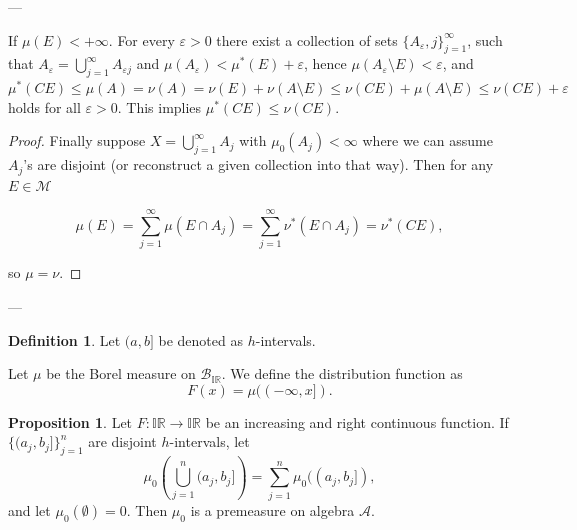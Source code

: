 \documentclass[11pt]{article}
\theoremstyle{definition}
\newtheorem{definition}{Definition}[section]
\newtheorem{proposition}{Proposition}[section]
\theoremstyle{remark}
\begin{document}
---

If $\mu(E) < +\infty$. For every $\varepsilon > 0$ there exist a collection of sets $\{A_\varepsilon, j\}_{j=1}^\infty$, such that $A_\varepsilon = \bigcup_{j=1}^\infty A_{\varepsilon j}$ and $\mu(A_\varepsilon) < \mu^*(E) + \varepsilon$, hence $\mu(A_\varepsilon \setminus E) < \varepsilon$, and $\mu^*(CE) \leq \mu(A) = \nu(A) = \nu(E) + \nu(A \setminus E) \leq \nu(CE) + \mu(A \setminus E) \leq \nu(CE) + \varepsilon$ holds for all $\varepsilon > 0$. This implies $\mu^*(CE) \leq \nu(CE)$.

\begin{proof}
Finally suppose $X = \bigcup_{j=1}^\infty A_j$ with $\mu_0(A_j) < \infty$ where we can assume $A_j$'s are disjoint (or reconstruct a given collection into that way). Then for any $E \in \mathcal{M}$

\[
\mu(E) = \sum_{j=1}^\infty \mu(E \cap A_j) = \sum_{j=1}^\infty \nu^*(E \cap A_j) = \nu^*(CE),
\]

so $\mu = \nu$.
\end{proof}

---



\begin{definition}\label{def:h-intervals}
Let $(a,b]$ be denoted as $h$-intervals.
\end{definition}

Let $\mu$ be the Borel measure on $\mathcal{B}_{\mathbb{IR}}$. We define the distribution function as
\[ F(x) = \mu((-\infty, x]). \]

\begin{proposition}\label{prop:premeasure}
Let $F: \mathbb{IR} \to \mathbb{IR}$ be an increasing and right continuous function. If $\{(a_j, b_j]\}_{j=1}^n$ are disjoint $h$-intervals, let
\[ \mu_0\left(\bigcup_{j=1}^n (a_j, b_j]\right) = \sum_{j=1}^n \mu_0((a_j, b_j]), \]
and let $\mu_0(\emptyset) = 0$. Then $\mu_0$ is a premeasure on algebra $\mathcal{A}$.
\end{proposition}
\end{document}
